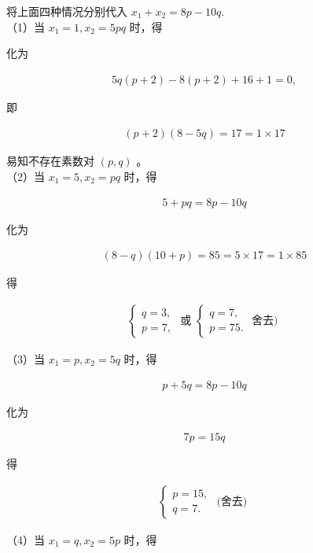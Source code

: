 \documentclass[10pt]{article}
\begin{document}
将上面四种情况分别代入 $x_{1}+x_{2}=8 p-10 q$.\\
（1）当 $x_{1}=1, x_{2}=5 p q$ 时，得

化为

\begin{align*}
5 q(p+2)-8(p+2)+16+1=0,
\end{align*}

即

\begin{align*}
(p+2)(8-5 q)=17=1 \times 17
\end{align*}

易知不存在素数对 $(p, q)$ 。\\
（2）当 $x_{1}=5, x_{2}=p q$ 时，得

\begin{align*}
5+p q=8 p-10 q
\end{align*}

化为

\begin{align*}
(8-q)(10+p)=85=5 \times 17=1 \times 85
\end{align*}

得

\begin{align*}
\left\{\begin{array} { l } 
{ q = 3 , } \\
{ p = 7 , }
\end{array} \text { 或 } \left\{\begin{array}{l}
q=7, \\
p=75 .
\end{array}\right.\right. \text { 舍去) }
\end{align*}

（3）当 $x_{1}=p, x_{2}=5 q$ 时，得

\begin{align*}
p+5 q=8 p-10 q
\end{align*}

化为

\begin{align*}
7 p=15 q
\end{align*}

得

\begin{align*}
\left\{\begin{array}{l}
p=15, \\
q=7 .
\end{array}\right. \text { (舍去) }
\end{align*}

（4）当 $x_{1}=q, x_{2}=5 p$ 时，得
\end{document}
